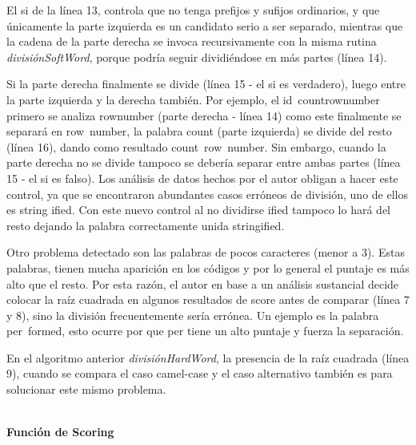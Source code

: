 El \textsf{si} de la línea 13, controla que no tenga prefijos y sufijos ordinarios, y que únicamente la parte izquierda es un candidato serio a ser separado, mientras que la cadena de la parte derecha se invoca recursivamente con la misma rutina \textit{divisiónSoftWord}, porque podría seguir dividiéndose en más partes (línea 14).

Si la parte derecha finalmente se divide (línea 15 - el \textsf{si} es verdadero), luego entre la parte izquierda y la derecha también. Por ejemplo, el \mbox{id \textsf{countrownumber}} primero se analiza \textsf{rownumber} (parte derecha - línea 14) como este finalmente se separará en \mbox{\textsf{row number}}, la palabra \textsf{count} (parte izquierda) se divide del resto (línea 16), dando como resultado \mbox{\textsf{count row number}}. Sin embargo, cuando la parte derecha no se divide tampoco se debería separar entre ambas partes (línea 15 - el \textsf{si} es falso). Los análisis de datos hechos por el autor \cite{EHPV09} obligan a hacer este control, ya que se encontraron abundantes casos erróneos de división, uno de ellos es \textsf{string ified}. Con este nuevo control al no dividirse \textsf{ified} tampoco lo hará del resto dejando la palabra correctamente unida \textsf{stringified}. 




Otro problema detectado son las palabras de pocos caracteres (menor a 3). Estas palabras, tienen mucha aparición en los códigos y por lo general el puntaje es más alto que el resto. Por esta razón, el autor \cite{EHPV09} en base a un análisis sustancial decide colocar la raíz cuadrada en algunos resultados de score antes de comparar (línea 7 y 8), sino la división frecuentemente sería errónea. Un ejemplo es la palabra \mbox{\textsf{per formed}}, esto ocurre por que \textsf{per} tiene un alto puntaje y fuerza la separación.

En el algoritmo anterior \textit{divisiónHardWord}, la presencia de la raíz cuadrada (línea 9), cuando se compara el caso camel-case y el caso alternativo también es para solucionar este mismo problema.

\noindent \textbf{\\Función de Scoring\\}

